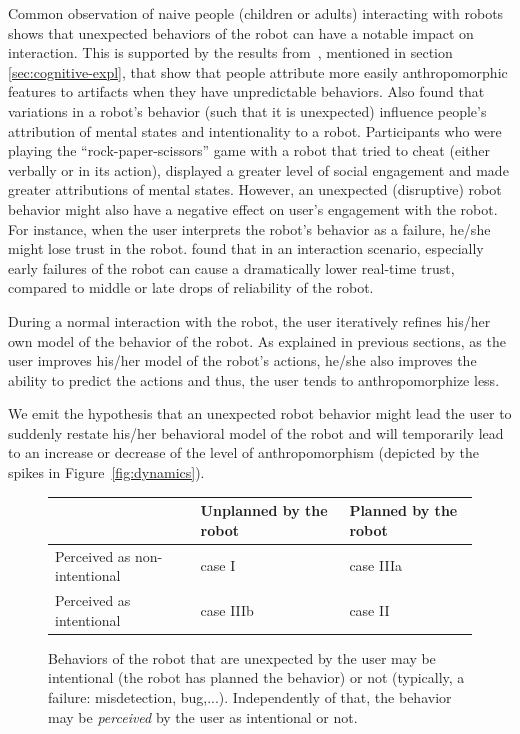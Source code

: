 \documentclass{frontiersSCNS} %
\begin{document}
Common observation of naive people (children or adults) interacting with robots
shows that unexpected behaviors of the robot can have a notable impact on
interaction. This is supported by the results from~\citet{Waytz2010}, mentioned in section
\ref{sec:cognitive-expl}, that show that people attribute more easily
anthropomorphic features to artifacts when they have unpredictable behaviors.
Also \cite{short_no_2010} found that variations in a robot's behavior (such that it is unexpected) influence people's attribution of mental states and intentionality to a robot. Participants who were playing the ``rock-paper-scissors'' game with a robot that tried to cheat (either verbally or in its action), displayed a greater level of social engagement and made greater attributions of mental states.
However, an unexpected (disruptive) robot behavior might also have a negative effect on user's engagement with the robot. For instance, when the user interprets the robot's behavior as a failure, he/she might lose trust in the robot. \cite{desai_impact_2013} found that in an interaction scenario, especially early failures of the robot can cause a dramatically lower real-time trust, compared to middle or late drops of reliability of the robot.

During a normal interaction with the robot, the user iteratively refines his/her
own model of the behavior of the robot. As explained in previous sections, as
the user improves his/her model of the robot's actions, he/she also improves the
ability to predict the actions and thus, the user tends to anthropomorphize
less.

We emit the hypothesis that an unexpected robot behavior might lead the user to
suddenly restate his/her behavioral model of the robot and will temporarily lead
to an increase or decrease of the level of anthropomorphism (depicted by the
spikes in Figure~\ref{fig:dynamics}).



\begin{figure}\footnotesize
    \centering
    \begin{tabular}{  >{\centering\arraybackslash}m{2cm} | >{\centering\arraybackslash}m{2cm} | >{\centering\arraybackslash}m{2cm} }
     & Unplanned by the robot & Planned by the robot \\ \hline
    Perceived as non-intentional & case I  & case IIIa  \\ \hline
    Perceived as intentional &  case IIIb & case II 
    \end{tabular}
\caption{
    Behaviors of the robot that are unexpected by the user may be intentional
    (the robot has planned the behavior) or not (typically, a failure:
    misdetection, bug,...). Independently of that, the behavior may be
    \emph{perceived} by the user as intentional or not.}
\label{fig:perceptionUnexpectedBehavior}
\end{figure}
\end{document}
